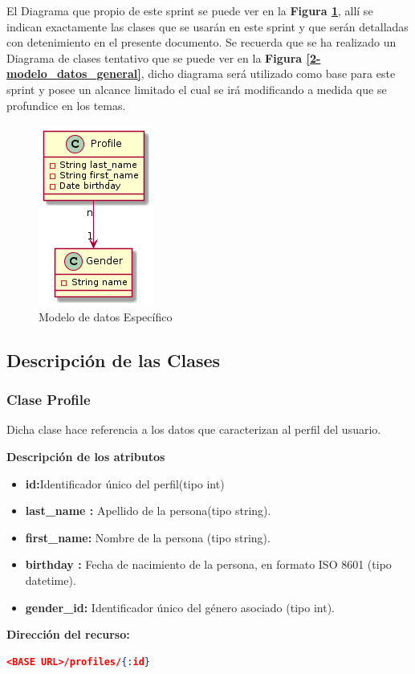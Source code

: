 El Diagrama que propio de este sprint se puede ver en la \textbf{Figura \ref{modeloEspecifico}}, allí se indican exactamente las clases que se usarán en este sprint y que serán detalladas con detenimiento en el presente documento. Se recuerda que se ha realizado un Diagrama de clases tentativo que se puede ver en la \textbf{Figura \ref{2-modelo_datos_general}}, dicho diagrama  será utilizado como base para este sprint y posee un alcance limitado el cual se irá modificando a medida que se profundice en los temas.



\begin{figure}[h]
  \centering
  \includegraphics[width=.2\textwidth]{img/tp1_parte2/1-modelo_dato_especifico}
  \caption{Modelo de datos Específico}
  \label{modeloEspecifico}
\end{figure}
\clearpage

\subsection{Descripción de las Clases}

    \subsubsection{Clase Profile}
    Dicha clase hace referencia a los datos que caracterizan al perfil del usuario.

    \textbf{Descripción de los atributos}
    \begin{itemize}
            \item \textbf{id:}Identificador único del perfil(tipo int)
			\item\textbf{ last\_name 	:}	Apellido de la persona(tipo string).
			\item \textbf{ first\_name: } 	Nombre de la persona (tipo string).
			\item \textbf{birthday 	:}	Fecha de nacimiento de la persona, en formato ISO 8601 (tipo datetime).
			\item \textbf{gender\_id:} 	Identificador único del género asociado 	(tipo int).
    \end{itemize} 
	\textbf{Dirección del recurso:}
    \begin{lstlisting}[language=json,firstnumber=1]
    <BASE URL>/profiles/{:id}
    \end{lstlisting}

